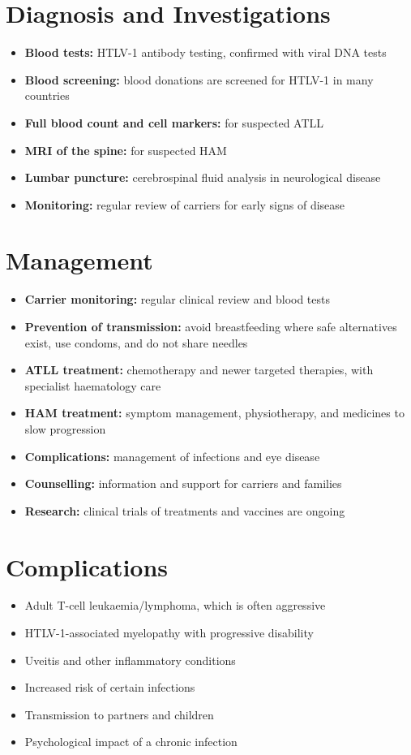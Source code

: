 \section*{Diagnosis and Investigations}
\begin{itemize}
    \item \textbf{Blood tests:} HTLV-1 antibody testing, confirmed with viral DNA tests
    \item \textbf{Blood screening:} blood donations are screened for HTLV-1 in many countries
    \item \textbf{Full blood count and cell markers:} for suspected ATLL
    \item \textbf{MRI of the spine:} for suspected HAM
    \item \textbf{Lumbar puncture:} cerebrospinal fluid analysis in neurological disease
    \item \textbf{Monitoring:} regular review of carriers for early signs of disease
\end{itemize}

\section*{Management}
\begin{itemize}
    \item \textbf{Carrier monitoring:} regular clinical review and blood tests
    \item \textbf{Prevention of transmission:} avoid breastfeeding where safe alternatives exist, use condoms, and do not share needles
    \item \textbf{ATLL treatment:} chemotherapy and newer targeted therapies, with specialist haematology care
    \item \textbf{HAM treatment:} symptom management, physiotherapy, and medicines to slow progression
    \item \textbf{Complications:} management of infections and eye disease
    \item \textbf{Counselling:} information and support for carriers and families
    \item \textbf{Research:} clinical trials of treatments and vaccines are ongoing
\end{itemize}

\section*{Complications}
\begin{itemize}
    \item Adult T-cell leukaemia/lymphoma, which is often aggressive
    \item HTLV-1-associated myelopathy with progressive disability
    \item Uveitis and other inflammatory conditions
    \item Increased risk of certain infections
    \item Transmission to partners and children
    \item Psychological impact of a chronic infection
\end{itemize}

